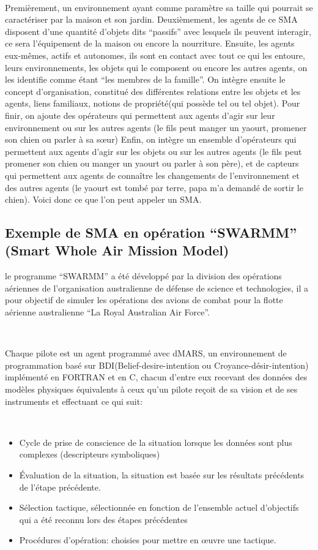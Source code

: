 ~\par
Premièrement, un environnement ayant comme paramètre sa taille qui pourrait se caractériser par la maison et son jardin. Deuxièmement, les agents de ce SMA disposent d’une quantité d’objets dits “passifs” avec lesquels ils peuvent interagir, ce sera l’équipement de la maison ou encore la nourriture. Ensuite, les agents eux-mêmes, actifs et autonomes, ils sont en contact avec tout ce qui les entoure, leurs environnements, les objets qui le composent ou encore les autres agents, on les identifie comme étant “les membres de la famille”. On intègre ensuite le concept d’organisation, constitué des différentes relations entre les objets et les agents, liens familiaux, notions de propriété(qui possède tel ou tel objet). Pour finir, on ajoute des opérateurs qui permettent aux agents d’agir sur leur environnement ou sur les autres agents (le fils peut manger un yaourt, promener son chien ou parler à sa sœur)
Enfin, on intègre un ensemble d'opérateurs qui permettent aux agents d'agir sur les objets ou sur les autres agents (le fils peut promener son chien ou manger un yaourt ou parler à son père), et de capteurs qui permettent aux agents de connaître les changements de l'environnement et des autres agents (le yaourt est tombé par terre, papa m'a demandé de sortir le chien). Voici donc ce que l'on peut appeler un SMA. \parencite{sma}


\subsection{Exemple de SMA en opération “SWARMM” (Smart Whole Air Mission Model)} \label{ssec:swarm}

le  programme “SWARMM” a été développé par la division des opérations aériennes de l’organisation australienne de défense de science et technologies, il a  pour objectif de simuler les opérations des avions de combat pour la flotte aérienne australienne “La Royal Australian Air Force”.

~\par
Chaque pilote est un agent programmé avec dMARS, un environnement de programmation basé sur BDI(Belief-desire-intention ou Croyance-désir-intention) implémenté en FORTRAN et en C, chacun d'entre eux recevant des données des modèles physiques équivalents à ceux qu'un pilote reçoit de sa vision et de ses instruments et effectuant ce qui suit:

~\par
\begin{itemize}
\item Cycle de prise de conscience de la situation lorsque les données sont plus complexes (descripteurs symboliques)
\item  Évaluation de la situation, la situation est basée sur les résultats précédents de l'étape précédente.
\item Sélection tactique, sélectionnée en fonction de l'ensemble actuel d'objectifs qui a été reconnu lors des étapes précédentes
\item Procédures d'opération: choisies pour mettre en œuvre une tactique.
\end{itemize}

